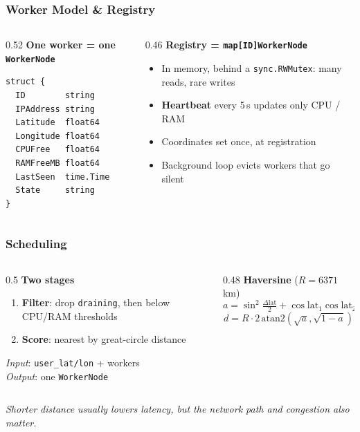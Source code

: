 \documentclass[11pt, aspectratio=169]{beamer}
\begin{document}
\begin{frame}[fragile]
	\frametitle{Worker Model \& Registry}
	\begin{columns}[t]
		\begin{column}{0.52\textwidth}
			\textbf{One worker = one \texttt{WorkerNode}}
\begin{lstlisting}
struct {
  ID        string
  IPAddress string
  Latitude  float64
  Longitude float64
  CPUFree   float64   
  RAMFreeMB float64
  LastSeen  time.Time
  State     string    
}
\end{lstlisting}
		\end{column}
		\begin{column}{0.46\textwidth}
			\textbf{Registry = \texttt{map[ID]WorkerNode}}
			\begin{itemize}
				\item In memory, behind a \texttt{sync.RWMutex}: many reads, rare writes
				\item \textbf{Heartbeat} every 5\,s updates only CPU / RAM
				\item Coordinates set once, at registration
				\item Background loop evicts workers that go silent
			\end{itemize}
			\medskip
		\end{column}
	\end{columns}
\end{frame}

\begin{frame}
	\frametitle{Scheduling}
	\begin{columns}[c]
		\begin{column}{0.5\textwidth}
			\textbf{Two stages}
			\begin{enumerate}
				\item \textbf{Filter}: drop \texttt{draining}, then below CPU/RAM thresholds
				\item \textbf{Score}: nearest by great-circle distance
			\end{enumerate}
			\smallskip
			\emph{Input}: \texttt{user\_lat/lon} + workers\\
			\emph{Output}: one \texttt{WorkerNode}
		\end{column}
		\begin{column}{0.48\textwidth}
			\textbf{Haversine} ($R=6371$\,km)
			\begin{equation*}
				a = \sin^2\!\tfrac{\Delta\mathrm{lat}}{2} + \cos\mathrm{lat}_1\cos\mathrm{lat}_2\sin^2\!\tfrac{\Delta\mathrm{lon}}{2}
			\end{equation*}
			\begin{equation*}
				d = R\cdot 2\,\mathrm{atan2}(\sqrt{a},\sqrt{1-a})
			\end{equation*}
		\end{column}
	\end{columns}
	\bigskip

		{\small\itshape Shorter distance usually lowers latency, but the network path and congestion also matter.}

\end{frame}
\end{document}
